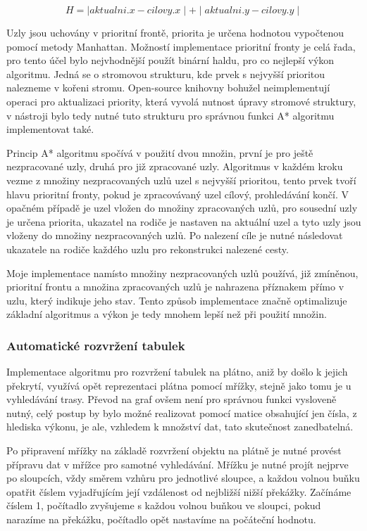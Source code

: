 \documentclass[czech,bachelor,public,dept460,male,oneside]{diploma}
\begin{document}
		\begin{equation}
			H = \mid aktualni.x - cilovy.x \mid + \mid aktualni.y - cilovy.y \mid
			\label{eq:manhattan}
		\end{equation}
		
		Uzly jsou uchovány v prioritní frontě, priorita je určena hodnotou vypočtenou pomocí metody Manhattan. Možností implementace prioritní fronty je celá řada, pro tento účel bylo nejvhodnější použít binární haldu, pro co nejlepší výkon algoritmu. Jedná se o stromovou strukturu, kde prvek s nejvyšší prioritou nalezneme v kořeni stromu. Open-source knihovny bohužel neimplementují operaci pro aktualizaci priority, která vyvolá nutnost úpravy stromové struktury, v nástroji bylo tedy nutné tuto strukturu pro správnou funkci A* algoritmu implementovat také. 
		
		Princip A* algoritmu spočívá v použití dvou množin, první je pro ještě nezpracované uzly, druhá pro již zpracované uzly. Algoritmus v každém kroku vezme z množiny nezpracovaných uzlů uzel s nejvyšší prioritou, tento prvek tvoří hlavu prioritní fronty, pokud je zpracovávaný uzel cílový, prohledávání končí. V opačném případě je uzel vložen do množiny zpracovaných uzlů, pro sousední uzly je určena priorita, ukazatel na rodiče je nastaven na aktuální uzel a tyto uzly jsou vloženy do množiny nezpracovaných uzlů. Po nalezení cíle je nutné následovat ukazatele na rodiče každého uzlu pro rekonstrukci nalezené cesty. 
		
		Moje implementace namísto množiny nezpracovaných uzlů používá, již zmíněnou, prioritní frontu a množina zpracovaných uzlů je nahrazena příznakem přímo v uzlu, který indikuje jeho stav. Tento způsob implementace značně optimalizuje základní algoritmus a výkon je tedy mnohem lepší než při použití množin.
		
		\subsubsection{Automatické rozvržení tabulek} \label{secTablePos}
		Implementace algoritmu pro rozvržení tabulek na plátno, aniž by došlo k jejich překrytí, využívá opět reprezentaci plátna pomocí mřížky, stejně jako tomu je u vyhledávání trasy. Převod na graf ovšem není pro správnou funkci vysloveně nutný, celý postup by bylo možné realizovat pomocí matice obsahující jen čísla, z hlediska výkonu, je ale, vzhledem k množství dat, tato skutečnost zanedbatelná. 
		
		Po připravení mřížky na základě rozvržení objektu na plátně je nutné provést přípravu dat v mřížce pro samotné vyhledávání. Mřížku je nutné projít nejprve po sloupcích, vždy směrem vzhůru pro jednotlivé sloupce, a každou volnou buňku opatřit číslem vyjadřujícím její vzdálenost od nejbližší nižší překážky. Začínáme číslem 1, počítadlo zvyšujeme s každou volnou buňkou ve sloupci, pokud narazíme na překážku, počítadlo opět nastavíme na počáteční hodnotu. 
		
\end{document}
